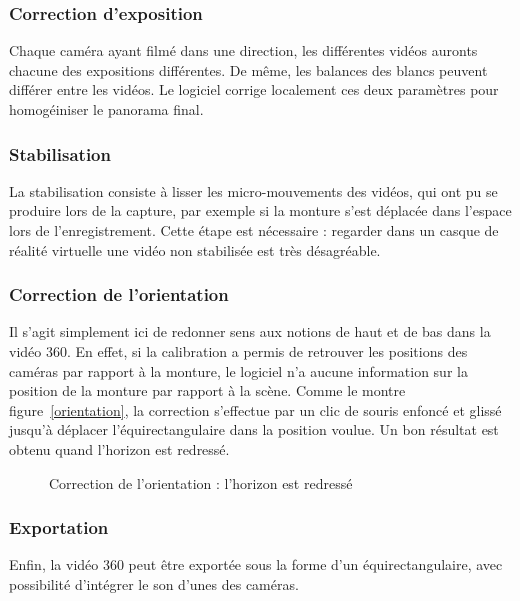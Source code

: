 \subsubsection{Correction d'exposition}
Chaque caméra ayant filmé dans une direction, les différentes vidéos auronts chacune 
des expositions différentes. De même, les balances des blancs peuvent différer
entre les vidéos. Le logiciel corrige localement ces deux paramètres pour homogéiniser
le panorama final.

\subsubsection{Stabilisation}
La stabilisation consiste à  lisser les micro-mouvements des vidéos, qui ont 
pu se produire lors de la capture, par exemple si la monture s'est déplacée dans l'espace lors
de l'enregistrement. Cette étape est nécessaire : regarder dans un casque de réalité
virtuelle une vidéo non stabilisée est très désagréable.

\subsubsection{Correction de l'orientation}
Il s'agit simplement ici de redonner sens aux notions de haut et de bas dans la 
vidéo 360. En effet, si la calibration a permis de retrouver les positions des 
caméras par rapport à la monture, le logiciel n'a aucune information sur la position
de la monture par rapport à la scène. Comme le montre figure~\ref{orientation},
la correction s'effectue par un clic de souris enfoncé
et glissé jusqu'à déplacer l'équirectangulaire dans la position voulue. Un bon résultat
est obtenu quand l'horizon est redressé.
\begin{figure}
  \centering
  \begin{minipage}{0.5\textwidth}
    \centering
  \end{minipage}%
  \begin{minipage}{0.5\textwidth}
    \centering
  \end{minipage}
  \caption{Correction de l'orientation : l'horizon est redressé}
\end{figure}
  \label{orientation}

\subsubsection{Exportation}
Enfin, la vidéo 360 peut être exportée sous la forme d'un équirectangulaire, avec
possibilité d'intégrer le son d'unes des caméras.


